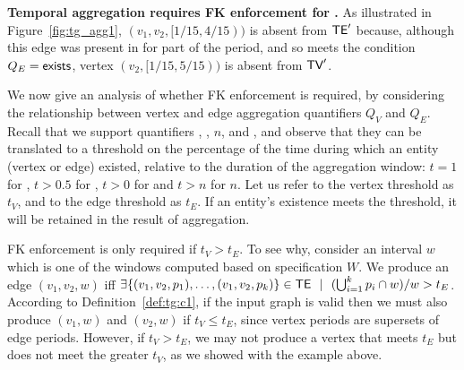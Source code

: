 {\bf Temporal aggregation requires FK enforcement for \tve.}  As
illustrated in Figure~\ref{fig:tg_agg1}, $(v_1,v_2,[1/15,4/15))$ is
  absent from $\textsf{TE}'$ because, although this edge was present in \tv
  for part of the period, and so meets the condition
  $Q_E=\textsf{exists}$, vertex $(v_2,[1/15,5/15))$ is absent from
    $\textsf{TV}'$.

We now give an analysis of whether FK enforcement is required, by
considering the relationship between vertex and edge aggregation
quantifiers $Q_V$ and $Q_E$.  Recall that we support quantifiers
, ,  $n$, and ,
and observe that they can be translated to a threshold on the
percentage of the time during which an entity (vertex or edge)
existed, relative to the duration of the aggregation window: $t = 1$
for , $t > 0.5$ for , $t > 0$ for
 and $t > n$ for  $n$.  Let us refer to
the vertex threshold as $t_V$, and to the edge threshold as $t_E$.  If
an entity's existence meets the threshold, it will be retained in the
result of aggregation.

FK enforcement is only required if $t_V > t_E$.  To see why, consider
an interval $w$ which is one of the windows computed based on
specification $W$.  We produce an edge $(v_1, v_2, w)$ iff $\exists
\{(v_1, v_2, p_1),\ldots,(v_1, v_2, p_k)\} \in
\textsf{TE}~~|~~(\bigcup_{i=1}^k p_i \cap w) / w > t_E$.  According to
Definition~\ref{def:tg:c1}, if the input graph is valid then we must
also produce $(v_1, w)$ and $(v_2, w)$ if $t_V \leq t_E$, since vertex
periods are supersets of edge periods.  However, if $t_V > t_E$, we
may not produce a vertex that meets $t_E$ but does not meet the
greater $t_V$, as we showed with the example above.


